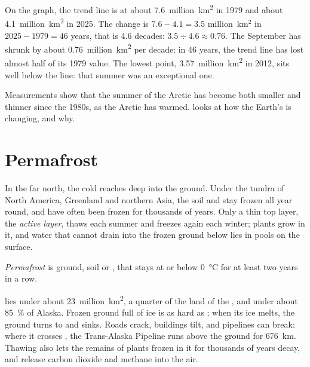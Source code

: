 \begin{example}
On the graph, the trend line is at about \num{7.6}~million~\unit{km^2} in 1979
and about \num{4.1}~million~\unit{km^2} in 2025. The change is $7.6 - 4.1 =
3.5$ million~km$^2$ in $2025 - 1979 = 46$ years, that is 4.6 decades:
$3.5 \div 4.6 \approx 0.76$. The September  has shrunk by about
\num{0.76}~million~\unit{km^2} per decade: in 46 years, the trend line has
lost almost half of its 1979 value. The
lowest point, \num{3.57}~million~\unit{km^2} in 2012, sits well below the line:
that summer was an exceptional one.
\end{example}

Measurements show that the summer  of the Arctic has become both
smaller and thinner since the 1980s, as the Arctic has warmed.
 looks at how the Earth's  is
changing, and why.

\section{Permafrost}

In the far north, the cold reaches deep into the ground. Under the
tundra of North America, Greenland and northern Asia, the soil and 
stay frozen all year round, and have often been frozen for thousands of
years. Only a thin top layer, the \emph{active
layer}, thaws each summer and freezes again each winter; plants grow in
it, and water that cannot drain into the frozen ground below lies in
pools on the surface.

\begin{definition}[Permafrost]\label{def:g8:ice-on-earth:permafrost}
\emph{Permafrost} is ground, soil or , that stays at or below
\qty{0}{\degreeCelsius} for at least two years in a row.
\end{definition}

 lies under about \num{23}~million~\unit{km^2}, a quarter of the land
of the , and under about 85~\% of Alaska. Frozen
ground full of ice is as hard as ; when its ice melts, the ground
turns to  and sinks. Roads crack, buildings tilt, and pipelines can
break: where it crosses , the Trans-Alaska Pipeline runs above
the ground for \qty{676}{km}. Thawing  also
lets the remains of plants frozen in it for thousands of years decay, and
release carbon dioxide and methane into the air.

